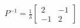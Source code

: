 \documentclass[preview]{standalone}
\begin{document}
\begin{align*}
P^{-1} = \frac{1}{3} \begin{bmatrix} 2 & -1 \\ -1 & 2 \end{bmatrix}
\end{align*}
\end{document}
